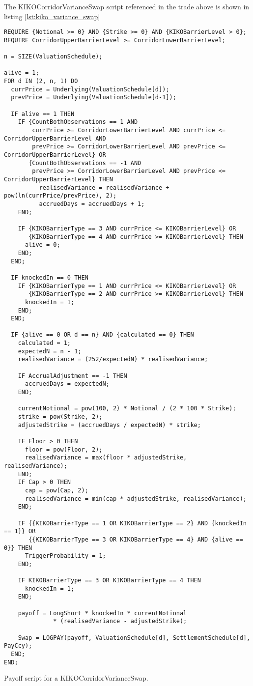 The KIKOCorridorVarianceSwap script referenced in the trade above is shown in listing
\ref{lst:kiko_variance_swap}

\begin{listing}[hbt]
\begin{verbatim}
REQUIRE {Notional >= 0} AND {Strike >= 0} AND {KIKOBarrierLevel > 0};
REQUIRE CorridorUpperBarrierLevel >= CorridorLowerBarrierLevel;

n = SIZE(ValuationSchedule);

alive = 1;
FOR d IN (2, n, 1) DO
  currPrice = Underlying(ValuationSchedule[d]);
  prevPrice = Underlying(ValuationSchedule[d-1]);

  IF alive == 1 THEN
    IF {CountBothObservations == 1 AND 
        currPrice >= CorridorLowerBarrierLevel AND currPrice <= CorridorUpperBarrierLevel AND
        prevPrice >= CorridorLowerBarrierLevel AND prevPrice <= CorridorUpperBarrierLevel} OR
       {CountBothObservations == -1 AND
        prevPrice >= CorridorLowerBarrierLevel AND prevPrice <= CorridorUpperBarrierLevel} THEN
          realisedVariance = realisedVariance + pow(ln(currPrice/prevPrice), 2);
          accruedDays = accruedDays + 1;
    END;

    IF {KIKOBarrierType == 3 AND currPrice <= KIKOBarrierLevel} OR
       {KIKOBarrierType == 4 AND currPrice >= KIKOBarrierLevel} THEN
      alive = 0;
    END;
  END;

  IF knockedIn == 0 THEN
    IF {KIKOBarrierType == 1 AND currPrice <= KIKOBarrierLevel} OR
       {KIKOBarrierType == 2 AND currPrice >= KIKOBarrierLevel} THEN
      knockedIn = 1;
    END;
  END;

  IF {alive == 0 OR d == n} AND {calculated == 0} THEN
    calculated = 1;
    expectedN = n - 1;
    realisedVariance = (252/expectedN) * realisedVariance;

    IF AccrualAdjustment == -1 THEN
      accruedDays = expectedN;
    END;

    currentNotional = pow(100, 2) * Notional / (2 * 100 * Strike);
    strike = pow(Strike, 2);
    adjustedStrike = (accruedDays / expectedN) * strike;

    IF Floor > 0 THEN
      floor = pow(Floor, 2);
      realisedVariance = max(floor * adjustedStrike, realisedVariance);
    END;
    IF Cap > 0 THEN
      cap = pow(Cap, 2);
      realisedVariance = min(cap * adjustedStrike, realisedVariance);
    END;

    IF {{KIKOBarrierType == 1 OR KIKOBarrierType == 2} AND {knockedIn == 1}} OR
       {{KIKOBarrierType == 3 OR KIKOBarrierType == 4} AND {alive == 0}} THEN
      TriggerProbability = 1;
    END;

    IF KIKOBarrierType == 3 OR KIKOBarrierType == 4 THEN
      knockedIn = 1;
    END;

    payoff = LongShort * knockedIn * currentNotional
              * (realisedVariance - adjustedStrike);

    Swap = LOGPAY(payoff, ValuationSchedule[d], SettlementSchedule[d], PayCcy);
  END;
END;
\end{verbatim}
\caption{Payoff script for a KIKOCorridorVarianceSwap.}
\label{lst:kiko_corridor_variance_swap}
\end{listing}

